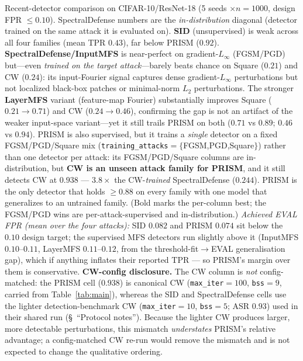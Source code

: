 \begin{table}[h]
\centering
\small

\caption{Recent-detector comparison on CIFAR-10/ResNet-18 (5 seeds
$\times n{=}1000$, design FPR $\le 0.10$). SpectralDefense numbers are the
\emph{in-distribution} diagonal (detector trained on the same attack it is
evaluated on). \textbf{SID} (unsupervised) is weak across all four families
(mean TPR $0.43$), far below PRISM ($0.92$). \textbf{SpectralDefense/InputMFS}
is near-perfect on gradient-$L_\infty$ (FGSM/PGD) but---even \emph{trained on
the target attack}---barely beats chance on Square ($0.21$) and CW ($0.24$):
its input-Fourier signal captures dense gradient-$L_\infty$ perturbations but
not localized black-box patches or minimal-norm $L_2$ perturbations. The
stronger \textbf{LayerMFS} variant (feature-map Fourier) substantially
improves Square ($0.21{\to}0.71$) and CW ($0.24{\to}0.46$), confirming the
gap is not an artifact of the weaker input-space variant---yet it still
trails PRISM on both ($0.71$ vs $0.89$; $0.46$ vs $0.94$). PRISM is also
supervised, but it trains a \emph{single} detector on a fixed FGSM/PGD/Square
mix (\texttt{training\_attacks}${=}\{$FGSM,PGD,Square$\}$) rather than one
detector per attack: its FGSM/PGD/Square columns are in-distribution, but
\textbf{CW is an unseen attack family for PRISM}, and it still detects CW at
$0.938$ --- $3.8\times$ the CW-\emph{trained} SpectralDefense ($0.244$). PRISM
is the only detector that holds $\ge 0.88$ on every family with one model that
generalizes to an untrained family. (Bold marks the per-column best; the
FGSM/PGD wins are per-attack-supervised and in-distribution.)
\emph{Achieved EVAL FPR (mean over the four attacks):} SID $0.082$ and PRISM
$0.074$ sit below the $0.10$ design target; the supervised MFS detectors run
slightly above it (InputMFS $0.10$--$0.11$, LayerMFS $0.11$--$0.12$, from the
threshold-fit$\to$EVAL generalisation gap), which if anything inflates their
reported TPR --- so PRISM's margin over them is conservative.
\textbf{CW-config disclosure.} The CW column is \emph{not} config-matched:
the PRISM cell ($0.938$) is canonical CW (\texttt{max\_iter}${=}100$,
\texttt{bss}${=}9$, carried from Table~\ref{tab:main}), whereas the SID and
SpectralDefense cells use the lighter detection-benchmark CW
(\texttt{max\_iter}${=}10$, \texttt{bss}${=}5$; ASR $0.93$) used in their
shared run (\S~``Protocol notes''). Because the lighter CW produces
larger, more detectable perturbations, this mismatch \emph{understates}
PRISM's relative advantage; a config-matched CW re-run would remove the
mismatch and is not expected to change the qualitative ordering.}
\label{tab:recent_baselines}
\end{table}

